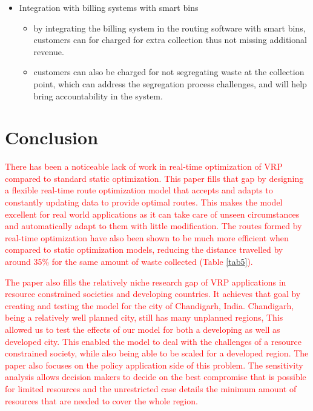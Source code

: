 \documentclass[12pt]{article}
\begin{document}
\begin{itemize}
\begin{itemize}
\begin{itemize}
 \end{itemize}
 \item Integration with billing systems with smart bins
   \begin{itemize}
 \item by integrating the billing system in the routing software with smart bins, customers can for charged for extra collection thus not missing additional revenue. \item customers can also be charged for not segregating waste at the collection point, which can address the segregation process challenges, and will help bring accountability in the system.
\end{itemize}
\end{itemize}
\end{itemize}
\section{Conclusion}
\textcolor{red}{There has been a noticeable lack of work in real-time optimization of VRP compared to standard static optimization. This paper fills that gap by designing a flexible real-time route optimization model that accepts and adapts to constantly updating data to provide optimal routes. This makes the model excellent for real world applications as it can take care of unseen circumstances and automatically adapt to them with little modification. The routes formed by real-time optimization have also been shown to be much more efficient when compared to static optimization models, reducing the distance travelled by around 35\% for the same amount of waste collected (Table \ref{tab5}).}

\textcolor{red}{The paper also fills the relatively niche research gap of VRP applications in resource constrained societies and developing countries. It achieves that goal by creating and testing the model for the city of Chandigarh, India. Chandigarh, being a relatively well planned city, still has many unplanned regions, This allowed us to test the effects of our model for both a developing as well as developed city. This enabled the model to deal with the challenges of a resource constrained society, while also being able to be scaled for a developed region. The paper also focuses on the policy application side of this problem. The sensitivity analysis allows decision makers to decide on the best compromise that is possible for limited resources and the unrestricted case details the minimum amount of resources that are needed to cover the whole region.}
\end{document}
